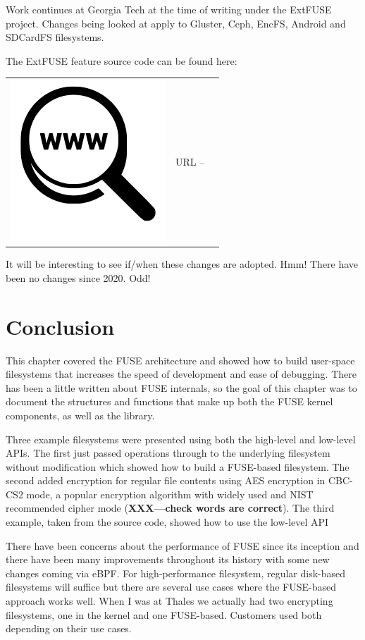 \noindent
Work continues at Georgia Tech at the time of writing under the ExtFUSE project. Changes being looked at apply to Gluster, Ceph, EncFS, Android and SDCardFS filesystems.

The ExtFUSE feature source code can be found here:

\begin{table}[h]
\begin{tabular}{lcl}
\parbox[r]{0.5in}{\includegraphics[scale=0.15]{figures/url.png}} & \parbox[l]{0.55in}{URL  -- } & \parbox[l]{3in}{}
\end{tabular}
\end{table}

\noindent
It will be interesting to see if/when these changes are adopted. Hmm! There have been no changes since 2020. Odd!


\section{Conclusion}

This chapter covered the FUSE architecture and showed how to build user-space filesystems that increases the speed of development and ease of debugging. There has been a little written about FUSE internals, so the goal of this chapter was to document the structures and functions that make up both the FUSE kernel components, as well as the  library.

Three example filesystems were presented using both the high-level and low-level APIs. The first just passed operations through to the underlying filesystem without modification which showed how to build a FUSE-based filesystem. The second added encryption for regular file contents using AES encryption in CBC-CS2 mode, a popular encryption algorithm with widely used and NIST recommended cipher mode (\textbf{XXX---check words are correct}). The third example, taken from the  source code, showed how to use the low-level API

There have been concerns about the performance of FUSE since its inception and there have been many improvements throughout its history with some new changes coming via eBPF. For high-performance filesystem, regular disk-based filesystems will suffice but there are several use cases where the FUSE-based approach works well. When I was at Thales we actually had two encrypting filesystems, one in the kernel and one FUSE-based. Customers used both depending on their use cases. 
